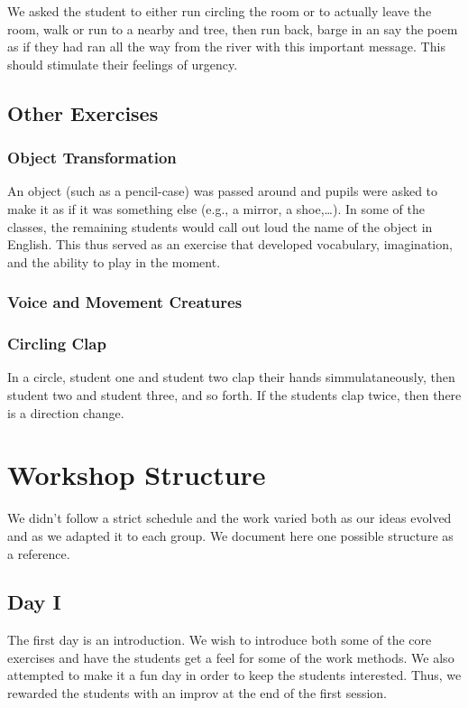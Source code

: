 \documentclass[article,twocolumn,twoside]{memoir}
\begin{document}
We asked the student to either run circling the room or to actually leave the
room, walk or run to a nearby and tree, then run back, barge in an say the poem
as if they had ran all the way from the river with this important message. This
should stimulate their feelings of urgency.

\section{Other Exercises}
\subsection{Object Transformation}
An object (such as a pencil-case) was passed around and pupils were asked to
make it as if it was something else (e.g., a mirror, a shoe,\dots). In some of
the classes, the remaining students would call out loud the name of the object
in English. This thus served as an exercise that developed vocabulary, imagination,
and the ability to play in the moment.

\subsection{Voice and Movement Creatures}
\subsection{Circling Clap}
In a circle, student one and student two clap their hands simmulataneously,
then student two and student three, and so forth. If the students clap twice,
then there is a direction change.

\chapter{Workshop Structure}

We didn't follow a strict schedule and the work varied both as our ideas
evolved and as we adapted it to each group. We document here one possible
structure as a reference.

\section{Day I}
The first day is an introduction. We wish to introduce both some of the core
exercises and have the students get a feel for some of the work methods. We
also attempted to make it a fun day in order to keep the students interested.
Thus, we rewarded the students with an improv at the end of the first session.
\end{document}
